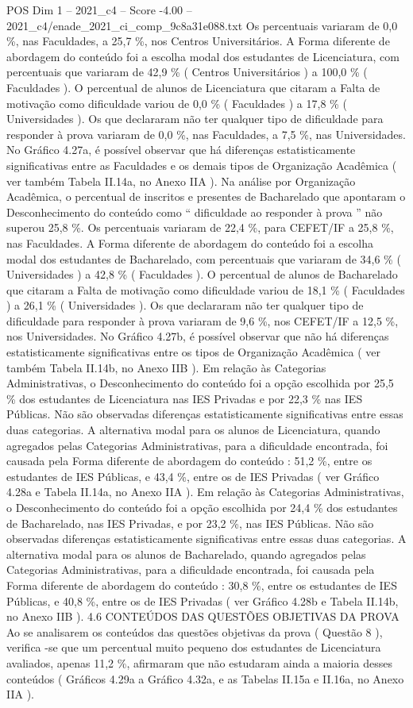 \begin{textsample}{POS Dim 1 – 2021\_c4 – Score -4.00 – 2021\_c4/enade\_2021\_ci\_comp\_9c8a31e088.txt}
Os percentuais variaram de 0,0 \%, nas Faculdades, a 25,7 \%, nos Centros Universitários.
A Forma diferente de abordagem do conteúdo foi a escolha modal dos estudantes de Licenciatura, com percentuais que variaram de 42,9 \% ( Centros Universitários ) a 100,0 \% ( Faculdades ).
O percentual de alunos de Licenciatura que citaram a Falta de motivação como dificuldade variou de 0,0 \% ( Faculdades ) a 17,8 \% ( Universidades ).
Os que declararam não ter qualquer tipo de dificuldade para responder à prova variaram de 0,0 \%, nas Faculdades, a 7,5 \%, nas Universidades.
No Gráfico 4.27a, é possível observar que há diferenças estatisticamente significativas entre as Faculdades e os demais tipos de Organização Acadêmica ( ver também Tabela II.14a, no Anexo IIA ).
Na análise por Organização Acadêmica, o percentual de inscritos e presentes de Bacharelado que apontaram o Desconhecimento do conteúdo como “ dificuldade ao responder à prova ” não superou 25,8 \%.
Os percentuais variaram de 22,4 \%, para CEFET/IF a 25,8 \%, nas Faculdades.
A Forma diferente de abordagem do conteúdo foi a escolha modal dos estudantes de Bacharelado, com percentuais que variaram de 34,6 \% ( Universidades ) a 42,8 \% ( Faculdades ).
O percentual de alunos de Bacharelado que citaram a Falta de motivação como dificuldade variou de 18,1 \% ( Faculdades ) a 26,1 \% ( Universidades ).
Os que declararam não ter qualquer tipo de dificuldade para responder à prova variaram de 9,6 \%, nos CEFET/IF a 12,5 \%, nos Universidades.
No Gráfico 4.27b, é possível observar que não há diferenças estatisticamente significativas entre os tipos de Organização Acadêmica ( ver também Tabela II.14b, no Anexo IIB ).
Em relação às Categorias Administrativas, o Desconhecimento do conteúdo foi a opção escolhida por 25,5 \% dos estudantes de Licenciatura nas IES Privadas e por 22,3 \% nas IES Públicas.
Não são observadas diferenças estatisticamente significativas entre essas duas categorias.
A alternativa modal para os alunos de Licenciatura, quando agregados pelas Categorias Administrativas, para a dificuldade encontrada, foi causada pela Forma diferente de abordagem do conteúdo : 51,2 \%, entre os estudantes de IES Públicas, e 43,4 \%, entre os de IES Privadas ( ver Gráfico 4.28a e Tabela II.14a, no Anexo IIA ).
Em relação às Categorias Administrativas, o Desconhecimento do conteúdo foi a opção escolhida por 24,4 \% dos estudantes de Bacharelado, nas IES Privadas, e por 23,2 \%, nas IES Públicas.
Não são observadas diferenças estatisticamente significativas entre essas duas categorias.
A alternativa modal para os alunos de Bacharelado, quando agregados pelas Categorias Administrativas, para a dificuldade encontrada, foi causada pela Forma diferente de abordagem do conteúdo : 30,8 \%, entre os estudantes de IES Públicas, e 40,8 \%, entre os de IES Privadas ( ver Gráfico 4.28b e Tabela II.14b, no Anexo IIB ). 4.6 CONTEÚDOS DAS QUESTÕES OBJETIVAS DA PROVA Ao se analisarem os conteúdos das questões objetivas da prova ( Questão 8 ), verifica -se que um percentual muito pequeno dos estudantes de Licenciatura avaliados, apenas 11,2 \%, afirmaram que não estudaram ainda a maioria desses conteúdos ( Gráficos 4.29a a Gráfico 4.32a, e as Tabelas II.15a e II.16a, no Anexo IIA ).

\end{textsample}
